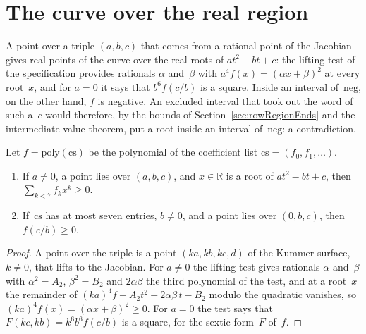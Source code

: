 \section{The curve over the real region}\label{sec:realRegion}

A point over a triple $(a, b, c)$ that comes from a rational point of the Jacobian gives real
points of the curve over the real roots of $a t^2 - b t + c$: the lifting test of the
specification provides rationals $\alpha$ and~$\beta$ with $a^4 f(x) = (\alpha x + \beta)^2$ at
every root~$x$, and for $a = 0$ it says that $b^6 f(c/b)$ is a square. Inside an interval
of~$\mathrm{neg}$, on the other hand, $f$ is negative. An excluded interval that took out the word
of such a~$c$ would therefore, by the bounds of Section~\ref{sec:rowRegionEnds} and the
intermediate value theorem, put a root inside an interval of~$\mathrm{neg}$: a contradiction.

\begin{lemma}\label{lem:sum_nonneg_of_hasPointOver}
  \leanok
  Let $f = \mathrm{poly}(\mathrm{cs})$ be the polynomial of the coefficient list
  $\mathrm{cs} = (f_0, f_1, \dots)$.
  \begin{enumerate}
    \item If $a \ne 0$, a point lies over $(a, b, c)$, and $x \in \mathbb{R}$ is a root of
      $a t^2 - b t + c$, then $\sum_{k < 7} f_k x^k \ge 0$.
    \item If~$\mathrm{cs}$ has at most seven entries, $b \ne 0$, and a point lies over
      $(0, b, c)$, then $f(c/b) \ge 0$.
  \end{enumerate}
\end{lemma}

\begin{proof}
  \leanok
  A point over the triple is a point $(ka, kb, kc, d)$ of the Kummer surface, $k \ne 0$, that lifts
  to the Jacobian. For $a \ne 0$ the lifting test gives rationals $\alpha$ and~$\beta$ with
  $\alpha^2 = A_2$, $\beta^2 = B_2$ and $2\alpha\beta$ the third polynomial of the test, and at a
  root~$x$ the remainder of $(ka)^4 f - A_2 t^2 - 2\alpha\beta\, t - B_2$ modulo the quadratic
  vanishes, so $(ka)^4 f(x) = (\alpha x + \beta)^2 \ge 0$. For $a = 0$ the test says that
  $F(kc, kb) = k^6 b^6 f(c/b)$ is a square, for the sextic form~$F$ of~$f$.
\end{proof}

